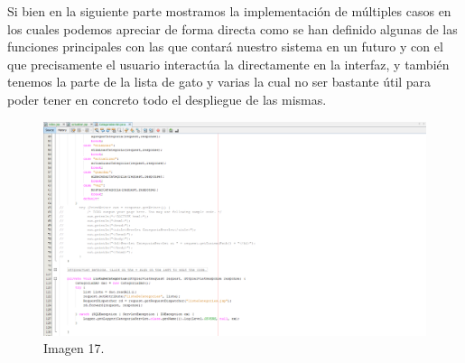 \documentclass[10pt,a4paper]{article}
\begin{document}
\vspace{60mm}

Si bien en la siguiente parte mostramos la implementación de múltiples casos en los cuales podemos apreciar de forma directa como se han definido algunas de las funciones principales con las que contará nuestro sistema en un futuro y con el que precisamente el usuario interactúa la directamente en la interfaz, y también tenemos la parte de la lista de gato y varias la cual no ser bastante útil para poder tener en concreto todo el despliegue de las mismas.

\begin{figure}[h]
\centering
\includegraphics[width=12cm]{categoriaServlet2}
\caption{Imagen 17.}
\label{fig:figure1}
\end{figure}
\end{document}
